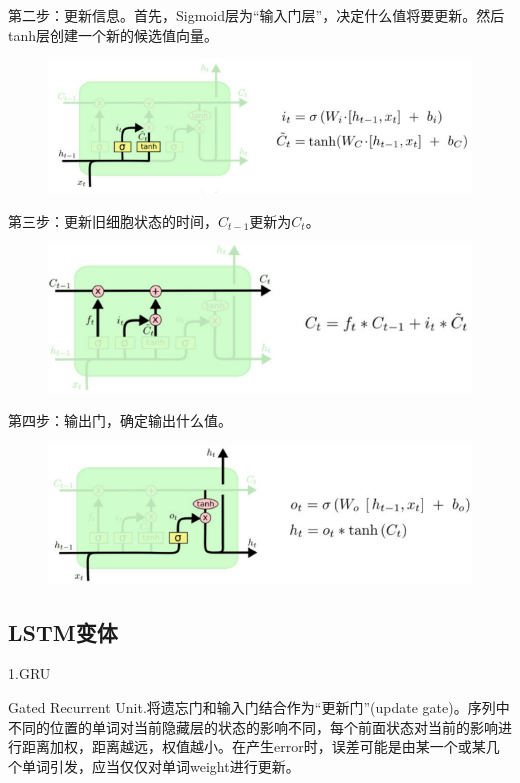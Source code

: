 \documentclass[openbib]{article}
\begin{document}
第二步：更新信息。首先，Sigmoid层为“输入门层”，决定什么值将要更新。然后tanh层创建一个新的候选值向量。
\begin{figure}[H]
	\centering
	\includegraphics[scale=0.4]{t时刻的记忆计算过程}
\end{figure}

第三步：更新旧细胞状态的时间，$C_{t-1}$更新为$C_t$。
\begin{figure}[H]
	\centering
	\includegraphics[scale=0.4]{更新时间}
\end{figure}

第四步：输出门，确定输出什么值。
\begin{figure}[H]
	\centering
	\includegraphics[scale=0.4]{确定输出值}
\end{figure}
\subsection{LSTM变体}
\begin{center}
	1.GRU
\end{center}

Gated Recurrent Unit.将遗忘门和输入门结合作为“更新门”(update gate)。序列中不同的位置的单词对当前隐藏层的状态的影响不同，每个前面状态对当前的影响进行距离加权，距离越远，权值越小。在产生error时，误差可能是由某一个或某几个单词引发，应当仅仅对单词weight进行更新。
\end{document}
